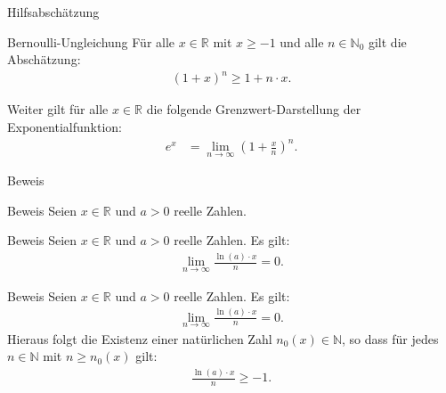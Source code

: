 \documentclass[10pt]{beamer}
\def\bN{\mathbb{N}}
\def\bR{\mathbb{R}}
\begin{document}
\begin{frame}{Hilfsabschätzung}
    \begin{block}{Bernoulli-Ungleichung}
        Für alle \( x \in \bR \) mit \( x \geq - 1 \) und alle \( n \in \bN_{0} \) gilt die Abschätzung:
        \begin{align*}
            \left( 1 + x \right)^{n}
            \geq 1 + n \cdot x.
        \end{align*}
    \end{block}
    Weiter gilt für alle \( x \in \bR \) die folgende Grenzwert-Darstellung der Exponentialfunktion:
    \begin{align*}
        e^{x} 
        & = \lim_{n \to \infty} \left( 1 + \frac{x}{n} \right)^{n}.
    \end{align*}
\end{frame}



\begin{frame}{Beweis}
    
\end{frame}



\begin{frame}{Beweis}
    Seien \( x \in \bR \) und \( a > 0 \) reelle Zahlen.
\end{frame}



\begin{frame}{Beweis}
    Seien \( x \in \bR \) und \( a > 0 \) reelle Zahlen. Es gilt:
    \begin{align*}
        \lim_{n \to \infty} \frac{\ln( a ) \cdot x}{n} = 0. 
    \end{align*}
\end{frame}



\begin{frame}{Beweis}
    Seien \( x \in \bR \) und \( a > 0 \) reelle Zahlen. Es gilt:
    \begin{align*}
        \lim_{n \to \infty} \frac{\ln( a ) \cdot x}{n} = 0. 
    \end{align*}
    Hieraus folgt die Existenz einer natürlichen Zahl \( n_{0}(x) \in \bN \), so dass für jedes \( n \in \bN \) mit \( n \geq n_{0}(x) \) gilt:
    \begin{align*}
        \frac{\ln( a ) \cdot x}{n} 
        \geq - 1.
    \end{align*}
\end{frame}
\end{document}
